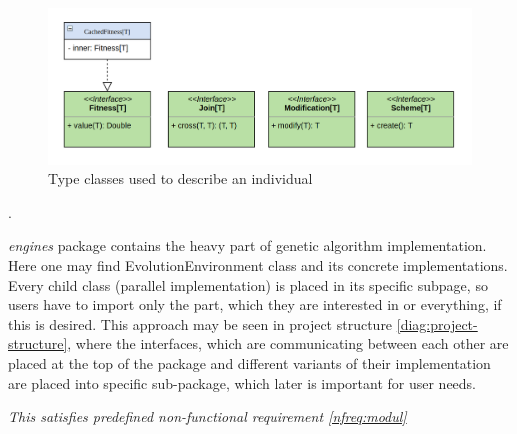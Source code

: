 \begin{figure}[h]
\centering\includegraphics[width=1.\textwidth]{img/diagrams/alleles-genotype}
\caption{Type classes used to describe an individual}\label{diag:genotype-classes}
\end{figure}.

\textit{engines} package contains the heavy part of genetic algorithm implementation. Here one may find EvolutionEnvironment class and its concrete implementations. Every child class (parallel implementation) is placed in its specific subpage, so users have to import only the part, which they are interested in or everything, if this is desired. This approach may be seen in project structure \ref{diag:project-structure}, where the interfaces, which are communicating between each other are placed at the top of the package and different variants of their implementation are placed into specific sub-package, which later is important for user needs.

\smallskip\textit{This satisfies predefined non-functional requirement \ref{nfreq:modul}}

